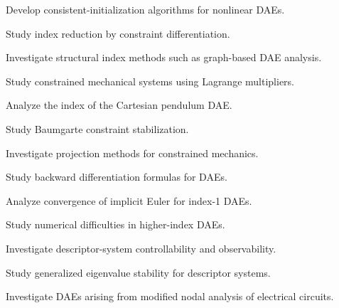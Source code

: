 \begin{exercise}[4]
Develop consistent-initialization algorithms for nonlinear DAEs.
\end{exercise}

\begin{exercise}[4]
Study index reduction by constraint differentiation.
\end{exercise}

\begin{exercise}[4]
Investigate structural index methods such as graph-based DAE analysis.
\end{exercise}

\begin{exercise}[4]
Study constrained mechanical systems using Lagrange multipliers.
\end{exercise}

\begin{exercise}[4]
Analyze the index of the Cartesian pendulum DAE.
\end{exercise}

\begin{exercise}[4]
Study Baumgarte constraint stabilization.
\end{exercise}

\begin{exercise}[4]
Investigate projection methods for constrained mechanics.
\end{exercise}

\begin{exercise}[4]
Study backward differentiation formulas for DAEs.
\end{exercise}

\begin{exercise}[4]
Analyze convergence of implicit Euler for index-1 DAEs.
\end{exercise}

\begin{exercise}[4]
Study numerical difficulties in higher-index DAEs.
\end{exercise}

\begin{exercise}[4]
Investigate descriptor-system controllability and observability.
\end{exercise}

\begin{exercise}[4]
Study generalized eigenvalue stability for descriptor systems.
\end{exercise}

\begin{exercise}[4]
Investigate DAEs arising from modified nodal analysis of electrical
circuits.
\end{exercise}

